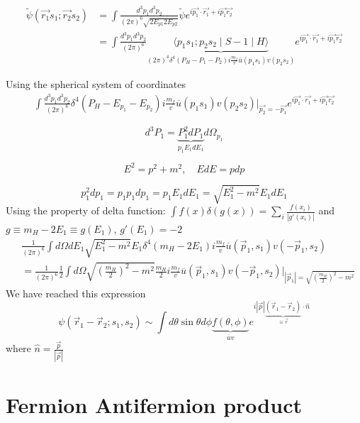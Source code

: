 \documentclass[12pt]{article}
\begin{document}
	\[
	\begin{aligned}
		\widetilde{\psi}(\vec{r_1} s_1; \vec{r_2} s_2) &= \int \frac{d^3 p_1 d^3 p_2}{(2 \pi)^6 \sqrt{2 E_{p1} 2 E_{p2}}} \widetilde{\psi} e^{i\vec{p_1} \cdot \vec{r_1} + i \vec{p_1} \vec{r_2}} \\
		&= \int \frac{d^3 p_1 d^3 p_2}{(2 \pi)^6} \underbrace{\langle p_1 s_1; p_2 s_2\mid S-1 \mid H\rangle}_{\left( 2 \pi \right)^4 \delta^4 \left(P_H - P_1 - P_2 \right) i \frac{m_f}{v} \overline{u}(p_1 s_1) v(p_2 s_2) } e^{i\vec{p_1} \cdot \vec{r_1} + i \vec{p_1} \vec{r_2}}
	\end{aligned}
	\]
	
	Using the spherical system of coordinates
	\[
	\begin{aligned}
		\int \frac{d^3 p_1 d^3 p_2}{(2 \pi)^6}  \delta^4 \left(P_H - E_{p_1} - E_{p_2} \right) i \frac{m_f}{v} \overline{u}(p_1 s_1) v(p_2 s_2) \Big|_{\vec{p_2} = -\vec{p_1}} e^{i\vec{p_1}  \cdot \vec{r_1} + i \vec{p_1} \vec{r_2}}
	\end{aligned}
	\]
	
	\[
	d^3 P_1 = \underbrace{P_1^2 dP_1}_{p_1 E_1 dE_1} d \Omega_{p_1} 
	\]
	
	\[
	E^2 = p^2 + m^2, \quad E dE = p dp
	\]
	
	\[
	p_1^2 dp_1 = p_1 p_1 dp_1 = p_1 E_1 dE_1 = \sqrt{E_1^2 -m^2} E_1 dE_1
	\]
	Using the property of delta function: $\int f(x) \delta(g(x)) = \sum_i \frac{f(x_i)}{|g'(x_i)|}$ and $g\equiv m_H - 2E_1\equiv g(E_1)$, $g'(E_1)=-2$
	\[
	\begin{aligned}
	&\frac{1}{(2 \pi)^6} \int d \Omega dE_1 \sqrt{E_1^2 - m^2} E_1 \delta^4 (m_H - 2 E_1) i \frac{m_f}{v} \overline{u}(\vec{p}_1, s_1) v(-\vec{p}_1, s_2)  \\
	&=\frac{1}{(2 \pi)^6} \frac{1}{2} \int d \Omega  \sqrt{(\frac{m_H}{2})^2 - m^2} \frac{m_H}{2} i \frac{m_f}{v} \overline{u}(\vec{p}_1, s_1) v(-\vec{p}_1, s_2) \Big|_{|\vec{p}_1| = \sqrt{\left( \frac{m_H}{2}\right)^2 - m^2}}
	\end{aligned}
	\]
	We have reached this expression
	\[
	\psi(\vec{r}_1 - \vec{r}_2; s_1, s_2) \sim \int d \theta \sin \theta d \phi \underbrace{f(\theta, \phi)}_{\overline{u}v} e^{i |\vec{p}| \underbrace{(\vec{r}_1 - \vec{r}_2)}_{\equiv \vec{r}} \cdot \hat{n}}
	\]
	where $\hat{n} = \frac{\vec{p}}{|\vec{p}|}$
	
	\section{Fermion Antifermion product}
	
\end{document}
